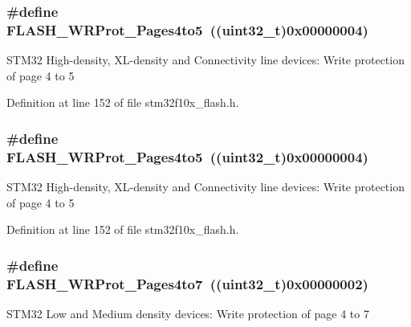 \subsubsection[{\texorpdfstring{F\+L\+A\+S\+H\+\_\+\+W\+R\+Prot\+\_\+\+Pages4to5}{FLASH_WRProt_Pages4to5}}]{\setlength{\rightskip}{0pt plus 5cm}\#define F\+L\+A\+S\+H\+\_\+\+W\+R\+Prot\+\_\+\+Pages4to5~(({\bf uint32\+\_\+t})0x00000004)}\hypertarget{group___option___bytes___write___protection_ga2835294ea5c096360cc5683b7f90b543}{}\label{group___option___bytes___write___protection_ga2835294ea5c096360cc5683b7f90b543}
S\+T\+M32 High-\/density, X\+L-\/density and Connectivity line devices\+: Write protection of page 4 to 5 

Definition at line 152 of file stm32f10x\+\_\+flash.\+h.

\subsubsection[{\texorpdfstring{F\+L\+A\+S\+H\+\_\+\+W\+R\+Prot\+\_\+\+Pages4to5}{FLASH_WRProt_Pages4to5}}]{\setlength{\rightskip}{0pt plus 5cm}\#define F\+L\+A\+S\+H\+\_\+\+W\+R\+Prot\+\_\+\+Pages4to5~(({\bf uint32\+\_\+t})0x00000004)}\hypertarget{group___option___bytes___write___protection_ga2835294ea5c096360cc5683b7f90b543}{}\label{group___option___bytes___write___protection_ga2835294ea5c096360cc5683b7f90b543}
S\+T\+M32 High-\/density, X\+L-\/density and Connectivity line devices\+: Write protection of page 4 to 5 

Definition at line 152 of file stm32f10x\+\_\+flash.\+h.

\subsubsection[{\texorpdfstring{F\+L\+A\+S\+H\+\_\+\+W\+R\+Prot\+\_\+\+Pages4to7}{FLASH_WRProt_Pages4to7}}]{\setlength{\rightskip}{0pt plus 5cm}\#define F\+L\+A\+S\+H\+\_\+\+W\+R\+Prot\+\_\+\+Pages4to7~(({\bf uint32\+\_\+t})0x00000002)}\hypertarget{group___option___bytes___write___protection_ga1b33c4de30c55331e7e60c0795c824ad}{}\label{group___option___bytes___write___protection_ga1b33c4de30c55331e7e60c0795c824ad}
S\+T\+M32 Low and Medium density devices\+: Write protection of page 4 to 7 

